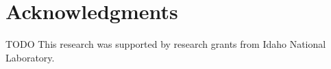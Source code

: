 \documentclass[11pt]{article}
\begin{document}
%
%
\section{Acknowledgments}
TODO This research was supported by research grants from Idaho National Laboratory.

\newpage


\end{document}
